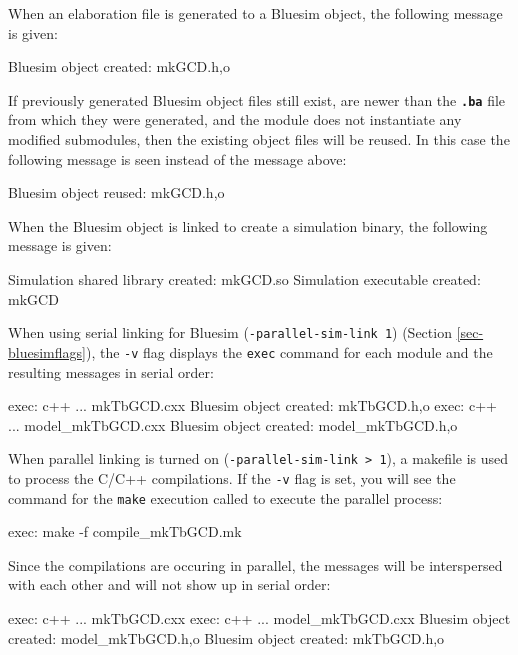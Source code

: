 \documentclass{article}
\newcommand{\te}[1]{\texttt{#1}}
\newenvironment{centerboxverbatim}
  {\center
   \boxedverbatim}
  {\endboxedverbatim
  {\endcenter }}
\begin{document}
When an elaboration file is generated to a Bluesim object, the
following message is given:

\begin{centerboxverbatim}
Bluesim object created: mkGCD.{h,o}
\end{centerboxverbatim}

If previously generated Bluesim object files still exist, are newer
than the {\tt\bf .ba} file from which they were generated, and the
module does not instantiate any modified submodules, then the
existing object files will be reused.  In this case the following
message is seen instead of the message above:

\begin{centerboxverbatim}
Bluesim object reused: mkGCD.{h,o}
\end{centerboxverbatim}

When the Bluesim object is linked to create a simulation binary, the
following message is given:

\begin{centerboxverbatim}
Simulation shared library created: mkGCD.so
Simulation executable created: mkGCD
\end{centerboxverbatim}

When using serial linking for Bluesim (\te{-parallel-sim-link 1}) (Section \ref{sec-bluesimflags}),
the \te{-v} flag displays the \te{exec} command for each module and
the resulting messages in serial order:

\begin{centerboxverbatim}
exec: c++ ... mkTbGCD.cxx
Bluesim object created: mkTbGCD.{h,o}
exec: c++ ... model_mkTbGCD.cxx
Bluesim object created: model_mkTbGCD.{h,o}
\end{centerboxverbatim}

When parallel linking is turned on (\te{-parallel-sim-link > 1}), 
a makefile is used to process the C/C++ compilations.
  If the \te{-v} flag is set, you will see
the command for the \te{make} execution called to execute the parallel process:

\begin{centerboxverbatim}
exec: make -f compile_mkTbGCD.mk
\end{centerboxverbatim}

Since the compilations are occuring in parallel, the messages will be
interspersed with each other and will not show up in serial order:

\begin{centerboxverbatim}
exec: c++ ... mkTbGCD.cxx
exec: c++ ... model_mkTbGCD.cxx
Bluesim object created: model_mkTbGCD.{h,o}
Bluesim object created: mkTbGCD.{h,o}
\end{centerboxverbatim}
\end{document}

